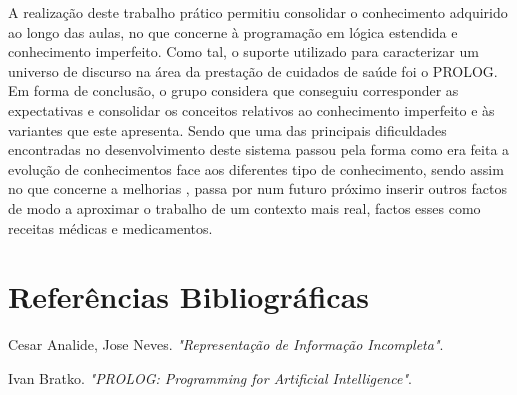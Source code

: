 \documentclass[25pt]{article}
\begin{document}
A realização deste trabalho prático permitiu consolidar o conhecimento adquirido ao longo das aulas, no que concerne
à programação em lógica estendida e conhecimento imperfeito. Como tal, o suporte utilizado para caracterizar um universo de discurso na área da prestação de cuidados de saúde foi o PROLOG.
Em forma de conclusão, o grupo considera que conseguiu corresponder as expectativas  e consolidar os conceitos relativos ao conhecimento
imperfeito e às variantes que este apresenta. 
Sendo que uma das principais dificuldades encontradas no desenvolvimento deste sistema passou pela forma como era feita a evolução de conhecimentos face aos diferentes tipo de conhecimento, sendo assim no que concerne a melhorias , passa por num futuro próximo inserir outros factos de modo a aproximar o trabalho de um contexto mais real, factos esses como receitas médicas e medicamentos.
\newpage
\section{Referências Bibliográficas}


\begin{thebibliography}{9}
Cesar Analide, Jose Neves. 
\textit{"Representação de Informação Incompleta"}. 

 
Ivan Bratko. 
\textit{"PROLOG: Programming for Artificial Intelligence"}. 

\end{thebibliography}




\newpage
\end{document}
